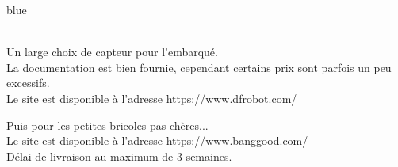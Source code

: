 \begin{items}{blue}{\Circle}
    \item {} \\ Un large choix de capteur pour l'embarqué.\\
    La documentation est bien fournie, cependant certains prix sont parfois un peu excessifs.\\
    Le site est disponible à l'adresse \url{https://www.dfrobot.com/}

    \item Puis  pour les petites bricoles pas chères... \\
    Le site est disponible à l'adresse \url{https://www.banggood.com/}\\
    Délai de livraison au maximum de 3 semaines.


\end{items}
